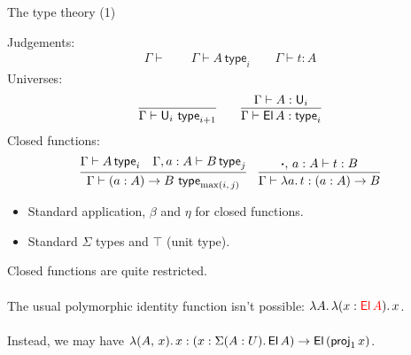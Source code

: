 \documentclass{beamer}
\newcommand{\type}{\mathsf{type}}
\begin{document}
\begin{frame}{The type theory (1)}

Judgements:
\begin{gather*}
  \Gamma \vdash  \hspace{2em}  \Gamma \vdash A\,\type_i \hspace{2em} \Gamma \vdash t : A
\end{gather*}
Universes:
\begin{gather*}
  \infer{\Gamma \vdash \U_i\,\,\type_{i+1}}{}
  \hspace{2em}
  \infer{\Gamma \vdash \El\,A : \type_i}{\Gamma \vdash A : \U_i}
\end{gather*}
Closed functions:
\begin{gather*}
  \infer{\Gamma \vdash (a : A)\ra B\,\,\type_{\max(i,\,j)}}{\Gamma \vdash A\,\type_i & \Gamma, a : A \vdash B\,\type_j}
  \hspace{1em}
  \infer{\Gamma \vdash \lambda a.\,t : (a : A)\ra B}{\boldsymbol{\cdot},\,a : A \vdash t : B}
\end{gather*}
\begin{itemize}
\item Standard application, $\beta$ and $\eta$ for closed functions.
\item Standard $\Sigma$ types and $\top$ (unit type).
\end{itemize}
\end{frame}

\begin{frame}{}

  Closed functions are quite restricted.\\~\\
  The usual polymorphic identity function isn't possible: $\lambda A.\,\lambda (x : {\color{red}\mathsf{El}\,A}).\, x$.\\~\\
  Instead, we may have $\lambda(A,\,x).\,x : (x : \Sigma(A : U).\,\mathsf{El}\,A) \rightarrow \mathsf{El}\,(\mathsf{proj}_1\,x)$.

\end{frame}
\end{document}
